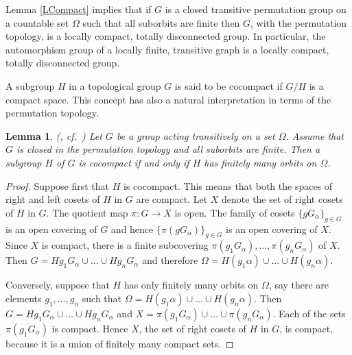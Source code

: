 \documentclass{emsprocart}
\newtheorem{lemma}[theorem]{Lemma}
\theoremstyle{definition}
\begin{document}
\bigskip

Lemma \ref{LCompact} 
implies that if $G$ is a closed transitive permutation group
on a countable set $\Omega$ such that all
suborbits are finite then $G$, with the permutation topology, is a
locally compact, totally
disconnected group.   In particular, the automorphism group of a locally finite,
transitive graph is a locally compact, totally disconnected group.

\bigskip

A subgroup $H$ in a topological group $G$ is said to be cocompact if
$G/H$ is a compact space.  This concept has also a natural
interpretation in terms of the permutation topology.

\begin{lemma}\label{Lcocompact}
{\rm (\cite[Proposition~1]{Nebbia2000}, cf.~\cite[Lemma~7.5]{Moller2002})}
Let $G$ be a group acting transitively on a set $\Omega$. Assume
that $G$ is closed in the permutation topology and all suborbits are
finite.
Then a subgroup $H$ of $G$ is
cocompact if and only if $H$ has finitely many orbits on
$\Omega$.
\end{lemma}

\begin{proof}  Suppose first that $H$ is cocompact.  This means that
both the spaces of right and left cosets of $H$ in $G$ are compact.
Let
$X$ denote the set of right cosets of $H$ in $G$.  The quotient map
$\pi:G\rightarrow X$ is open.  The family of cosets $\{gG_\alpha\}_{g\in
  G}$ is an open covering of $G$ and hence
$\{\pi(gG_\alpha)\}_{g\in G}$ is an open covering of $X$.  Since $X$ is compact, there is a finite subcovering
$\pi(g_1G_\alpha),\ldots, \pi(g_nG_\alpha)$ of $X$.  Then
$G=Hg_1G_\alpha\cup\ldots\cup Hg_nG_\alpha$ and therefore
$\Omega=H(g_1\alpha)\cup\ldots\cup H(g_n\alpha)$.

Conversely, suppose that $H$ has only finitely many orbits on $\Omega$, say
there are elements $g_1, \ldots, g_n$ such that
$\Omega=H(g_1\alpha)\cup\ldots\cup H(g_n\alpha)$.  Then
$G=Hg_1G_\alpha \cup\ldots\cup Hg_nG_\alpha$ and
$X=\pi(g_1G_\alpha)\cup \ldots\cup \pi(g_nG_\alpha)$.  Each of the
sets $\pi(g_1G_\alpha)$ is compact.  Hence $X$, the set of right
cosets of $H$ in $G$, is
compact, because it is a union of finitely many compact
sets.   \end{proof}

\bigskip
\end{document}
